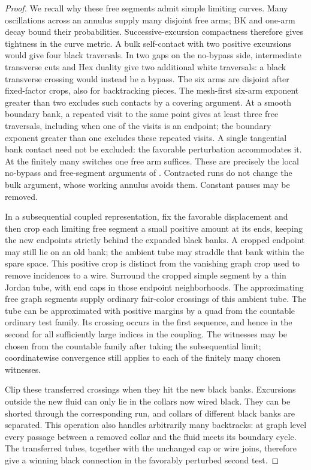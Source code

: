\begin{proof}
We recall why these free segments admit simple limiting curves.  Many
oscillations across an annulus supply many disjoint free arms; BK and
one-arm decay bound their probabilities.  Successive-excursion
compactness therefore gives tightness in the curve metric.  A bulk
self-contact with two positive excursions would give four black
traversals.  In two gaps on the no-bypass side, intermediate transverse
cuts and Hex duality give two additional white traversals: a black
transverse crossing would instead be a bypass.  The six arms are
disjoint after fixed-factor crops, also for backtracking pieces.
The mesh-first six-arm exponent greater than two excludes such contacts
by a covering argument.  At a smooth boundary bank, a repeated visit to
the same point gives at least three free traversals, including when one
of the visits is an endpoint; the boundary exponent greater than one
excludes these repeated visits.  A single tangential bank contact need
not be excluded: the favorable perturbation accommodates it.  At the finitely
many switches one free arm suffices.  These are precisely the local
no-bypass and free-segment arguments of \cite[Section 4, ``Free segments
of a terminal path'']{V}.  Contracted runs do not change the bulk argument,
whose working annulus avoids them.  Constant pauses may be removed.

In a subsequential coupled representation, fix the favorable displacement
and then crop each limiting free segment a small positive amount at its
ends, keeping the new endpoints strictly behind the expanded black
banks.  A cropped endpoint may still lie on an old bank; the ambient
tube may straddle that bank within the spare space.  This positive crop is distinct from the vanishing
graph crop used to remove incidences to a wire.  Surround the cropped
simple segment by a thin Jordan tube, with end caps in those endpoint
neighborhoods.  The approximating free graph segments supply ordinary
fair-color crossings of this ambient tube.  The tube can be approximated with positive margins by a quad
from the countable ordinary test family.  Its crossing occurs in the
first sequence, and hence in the second for all sufficiently large
indices in the coupling.  The witnesses may be chosen from the countable
family after taking the subsequential limit; coordinatewise convergence
still applies to each of the finitely many chosen witnesses.

Clip these transferred crossings when they hit the new black banks.
Excursions outside the new fluid can only lie in the collars now wired
black.  They can be shorted through the corresponding run, and collars
of different black banks are separated.  This operation also handles
arbitrarily many backtracks: at graph level every passage between a
removed collar and the fluid meets its boundary cycle.  The transferred
tubes, together with the unchanged cap or wire joins, therefore give a
winning black connection in the favorably perturbed second test.


\end{proof}
